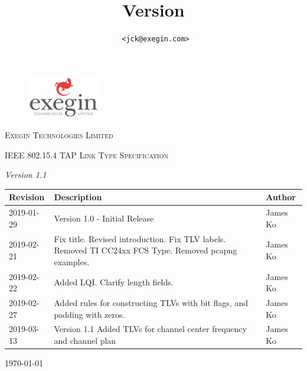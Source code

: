 \documentclass[12pt]{article}
\title{
\maintitle
\\\company
\\\hfill\\\normalsize Version \versionnumber
}
\author{\authorname~\tt{<jck@exegin.com>}}
\newcommand\versionnumber{1.1}
\renewcommand\_{\textunderscore\allowbreak}
\begin{document}
\begin{titlepage}
    \vspace{5cm}
    \begin{figure}
        \includegraphics[scale=1]{exegin.png}
    \end{figure}
    \vspace{2cm}
    {\scshape\LARGE Exegin Technologies Limited \par}
    \vspace{5cm}
    {\scshape\Large IEEE 802.15.4 TAP Link Type Specification\par}
    {\itshape Version \versionnumber}
    \vspace{2cm}
    \vfill

    \vfill

    \begin{tabular}{|p{2cm}|p{11.5cm}| p{3cm}|}
\hline
    \textbf{Revision} & \textbf{Description} & \textbf{Author}\\
\hline
    2019-01-29 & Version 1.0 - Initial Release & James Ko\\
\hline
    2019-02-21 & Fix title. Revised introduction. Fix TLV labels.
    Removed TI CC24xx FCS Type. Removed pcapng examples. & James Ko\\
\hline
    2019-02-22 & Added LQI. Clarify length fields. & James Ko\\
\hline
    2019-02-27 & Added rules for constructing TLVs with bit flags, and padding
        with zeros.  & James Ko\\
\hline
    2019-03-13 & Version 1.1 Added TLVs for channel center frequency and
        channel plan & James Ko\\ \hline
\end{tabular}

    {\large \today\par}
\end{titlepage}

\newpage
\tableofcontents

\newpage
\end{document}
